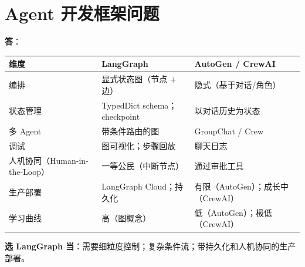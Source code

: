 \section{Agent 开发框架问题}
\label{agent-development-framework-questions}

\begin{questionbox}
\textbf{答}：

\noindent\begin{tabularx}{\linewidth}{@{}l Z{0.99} Z{1.01}@{}}
\toprule
\textbf{维度} & \textbf{LangGraph} & \textbf{AutoGen / CrewAI} \\
\midrule
编排 & 显式状态图（节点 + 边） & 隐式（基于对话/角色） \\
状态管理 & TypedDict schema；checkpoint & 以对话历史为状态 \\
多 Agent & 带条件路由的图 & GroupChat / Crew \\
调试 & 图可视化；步骤回放 & 聊天日志 \\
人机协同（Human-in-the-Loop） & 一等公民（中断节点） & 通过审批工具 \\
生产部署 & LangGraph Cloud；持久化 & 有限（AutoGen）；成长中（CrewAI） \\
学习曲线 & 高（图概念） & 低（AutoGen）；极低（CrewAI） \\
\bottomrule
\end{tabularx}

\textbf{选 LangGraph 当}：需要细粒度控制；复杂条件流；带持久化和人机协同的生产部署。


\end{questionbox}
